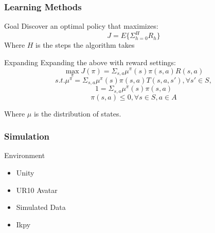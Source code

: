 \begin{frame}
  \frametitle{Learning Methods}
  \begin{block}{Goal}
    Discover an optimal policy that maximizes:
    $$J=E\{\Sigma_{h=0}^HR_h\}$$
    Where $H$ is the steps the algorithm takes
  \end{block}

  \begin{exampleblock}{Expanding}
    Expanding the above with reward settings:
    $$\max_{\pi}J(\pi) = \Sigma_{s,a}\mu^{\pi}(s)\pi(s, a)R(s, a)$$
    $$s.t. \mu^{\pi} = \Sigma_{s,a}\mu^{\pi}(s)\pi(s, a)T(s,a,s'),
    \forall s'\in S,$$
    $$1 = \Sigma_{s,a}\mu^{\pi}(s)\pi(s, a)$$
    $$\pi(s, a)\le 0, \forall s\in S, a\in A$$
    
    Where $\mu$ is the distribution of states.
  \end{exampleblock}
\end{frame}

\begin{frame}
  \frametitle{Simulation}
  \begin{block}{Environment}
    \begin{itemize}
    \item Unity
    \item UR10 Avatar
    \item Simulated Data
    \item Ikpy
    \end{itemize}
  \end{block}
\end{frame}

